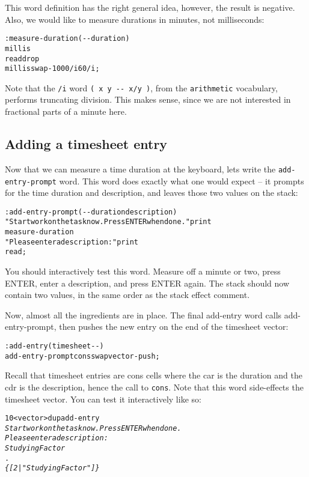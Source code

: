 \documentclass[english]{article}
\begin{document}
This word definition has the right general idea, however, the result
is negative. Also, we would like to measure durations in minutes,
not milliseconds:

\begin{alltt}
: measure-duration ( -{}- duration )
    millis
    read drop
    millis swap - 1000 /i 60 /i ;
\end{alltt}

Note that the \texttt{/i} word \texttt{( x y -{}- x/y )}, from the
\texttt{arithmetic} vocabulary, performs truncating division. This
makes sense, since we are not interested in fractional parts of a
minute here.

\subsection{Adding a timesheet entry}

Now that we can measure a time duration at the keyboard, lets write
the \texttt{add-entry-prompt} word. This word does exactly what one
would expect -- it prompts for the time duration and description,
and leaves those two values on the stack:

\begin{alltt}
: add-entry-prompt ( -{}- duration description )
    "Start work on the task now. Press ENTER when done." print
    measure-duration
    "Please enter a description:" print
    read ;
\end{alltt}

You should interactively test this word. Measure off a minute or two,
press ENTER, enter a description, and press ENTER again. The stack
should now contain two values, in the same order as the stack effect
comment.

Now, almost all the ingredients are in place. The final add-entry
word calls add-entry-prompt, then pushes the new entry on the end
of the timesheet vector:

\begin{alltt}
: add-entry ( timesheet -{}- )
    add-entry-prompt cons swap vector-push ;
\end{alltt}

Recall that timesheet entries are cons cells where the car is the
duration and the cdr is the description, hence the call to \texttt{cons}.
Note that this word side-effects the timesheet vector. You can test
it interactively like so:

\begin{alltt}
10 <vector> dup add-entry
\emph{Start work on the task now. Press ENTER when done.}
\emph{Please enter a description:}
\emph{Studying Factor}
.
\emph{\{ {[} 2 | "Studying Factor" {]} \}}
\end{alltt}
\end{document}
